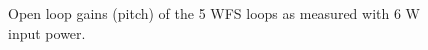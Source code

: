 \begin{figure}
\begin{centering}
\caption{Open loop gains (pitch) of the 5 WFS loops as measured with 6 W
  input power.}
\label{fig:olgs6W}
\end{centering}
\end{figure}







